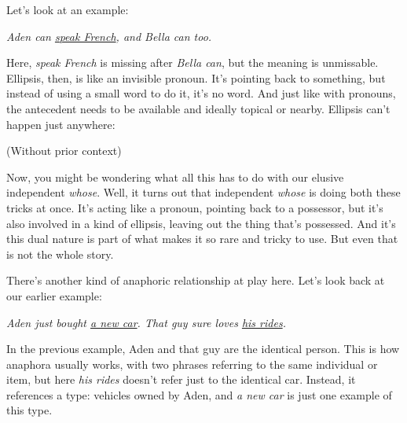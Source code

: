 Let's look at an example:

\ea \textit{Aden can \uline{speak French}, and Bella can \uline{\phantom{speak French}} too.}\\
\z

Here, \textit{speak French} is missing after \textit{Bella can}, but the meaning is unmissable. Ellipsis, then, is like an invisible pronoun. It's pointing back to something, but instead of using a small word to do it, it's no word. And just like with pronouns, the antecedent needs to be available and ideally topical or nearby. Ellipsis can't happen just anywhere:

 (Without prior context)
\z

Now, you might be wondering what all this has to do with our elusive independent \textit{whose}. Well, it turns out that independent \textit{whose} is doing both these tricks at once. It's acting like a pronoun, pointing back to a possessor, but it's also involved in a kind of ellipsis, leaving out the thing that's possessed. And it's this dual nature is part of what makes it so rare and tricky to use. But even that is not the whole story.

\bigskip

There's another kind of anaphoric relationship at play here. Let's look back at our earlier example:

\ea \textit{Aden just bought \uline{a new car}. That guy sure loves \uline{his rides}.}\\
    \label{ex:Aden2}
\z

In the previous example, Aden and that guy are the identical person. This is how anaphora usually works, with two phrases referring to the same individual or item, but here \textit{his rides} doesn't refer just to the identical car. Instead, it references a type: vehicles owned by Aden, and \textit{a new car} is just one example of this type.

